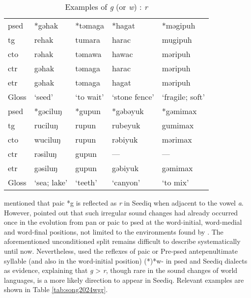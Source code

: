 \begin{table}[!htbp]
\centering
\caption{Examples of \textit{g} (or \textit{w}) : \textit{r}}
\label{tab:irr_gr}
\begin{tabular}{lllll}
\hline
\acs{psed}& *gəhak   & *təmaga & *hagat   & *məgipuh \\ \hdashline
\acs{tg}  & rehak    & tumara  & harac    & mugipuh  \\
\acs{cto} & rəhak    & təmawa  & hawac    & məripuh  \\
\acs{ctr} & gəhak    & təmaga  & harac    & məripuh  \\
\acs{etr} & gəhak    & təmaga  & hagat    & məripuh  \\ \hline
Gloss     & `seed'            & `to wait'        & `stone fence'     & `fragile; soft'   \\ \hline \hline
\acs{psed}& *gəciluŋ & *gupun  & *gəbəyuk & *gəmimax \\ \hdashline
\acs{tg}  & ruciluŋ  & rupun   & rubeyuk  & gumimax  \\
\acs{cto} & wuciluŋ  & rupun   & rəbiyuk  & mərimax  \\
\acs{ctr} & rəsiluŋ  & gupun   & ---               & ---               \\
\acs{etr} & gəsiluŋ  & gupun   & gəbiyuk  & gəmimax  \\ \hline
Gloss     & `sea; lake'       & `teeth'          & `canyon'          & `to mix'         \\ \hline
\end{tabular}
\end{table}

\textcite{li1981paic} mentioned that \acl{paic} *g is reflected as \textit{r} in Seediq  when adjacent to the vowel \textit{a}. However, \textcite{song2024Aicg} pointed out that such irregular sound changes had already occurred once in the evolution from \acl{pan} or \acl{paic} to \acl{psed} at the word-initial, word-medial and word-final positions, not limited to the environments found by \textcite{li1981paic}. The aforementioned unconditioned split remains difficult to describe systematically until now. Nevertheless, \textcite{song2024Aicg} used the reflexes of \acl{paic} or Pre-\acl{psed} antepenultimate syllable (and also in the word-initial position) (*)*w- in \acl{psed} and Seediq dialects as evidence, explaining that \textit{g} > \textit{r}, though rare in the sound changes of world languages, is a more likely direction to appear in Seediq. Relevant examples are shown in Table \ref{tab:song2024wgr}.

